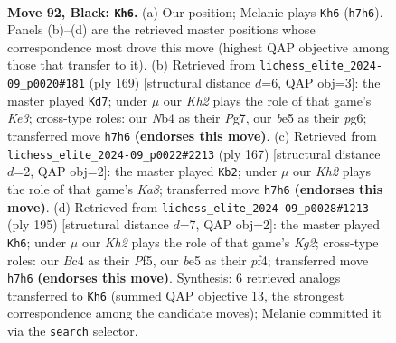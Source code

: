 \documentclass[11pt]{article}
\begin{document}
\clearpage

\begin{figure}[p]\centering
\begin{subfigure}{0.46\textwidth}\centering
\resizebox{\linewidth}{!}{%
\newchessgame
\chessboard[
  setfen={8/7k/8/4B3/1nb5/8/5PK1/8 b - - 30 92},
  showmover=false,
  pgfstyle=straightmove, color=movearrow, markmove={h7-h6}
]}
\caption{}
\end{subfigure}\hfill
\begin{subfigure}{0.46\textwidth}\centering
\resizebox{\linewidth}{!}{%
\newchessgame
\chessboard[
  setfen={8/6p1/1P2k1P1/2K5/8/4n3/8/8 b - - 0 85},
  showmover=false,
  pgfstyle=straightmove, color=movearrow, markmove={e6-d7}
]}
\caption{}
\end{subfigure}
\\[4pt]
\begin{subfigure}{0.46\textwidth}\centering
\resizebox{\linewidth}{!}{%
\newchessgame
\chessboard[
  setfen={8/8/6b1/8/1PK5/6B1/8/k7 b - - 2 84},
  showmover=false,
  pgfstyle=straightmove, color=movearrow, markmove={a1-b2}
]}
\caption{}
\end{subfigure}\hfill
\begin{subfigure}{0.46\textwidth}\centering
\resizebox{\linewidth}{!}{%
\newchessgame
\chessboard[
  setfen={8/6k1/8/5p2/5P1P/7K/8/8 b - - 15 98},
  showmover=false,
  pgfstyle=straightmove, color=movearrow, markmove={g7-h6}
]}
\caption{}
\end{subfigure}
\caption{\textbf{Move 92, Black: \texttt{Kh6}.} (a) Our position; Melanie plays \texttt{Kh6} (\texttt{h7h6}). Panels (b)--(d) are the retrieved master positions whose correspondence most drove this move (highest QAP objective among those that transfer to it). (b) Retrieved from \texttt{lichess\_elite\_2024-09\_p0020\#181} (ply 169) [structural distance $d$=6, QAP obj=3]: the master played \texttt{Kd7}; under $\mu$ our \emph{Kh2} plays the role of that game's \emph{Ke3}; cross-type roles: our \emph{N}b4 as their \emph{P}g7, our \emph{b}e5 as their \emph{p}g6; transferred move \texttt{h7h6} \textbf{(endorses this move)}. (c) Retrieved from \texttt{lichess\_elite\_2024-09\_p0022\#2213} (ply 167) [structural distance $d$=2, QAP obj=2]: the master played \texttt{Kb2}; under $\mu$ our \emph{Kh2} plays the role of that game's \emph{Ka8}; transferred move \texttt{h7h6} \textbf{(endorses this move)}. (d) Retrieved from \texttt{lichess\_elite\_2024-09\_p0028\#1213} (ply 195) [structural distance $d$=7, QAP obj=2]: the master played \texttt{Kh6}; under $\mu$ our \emph{Kh2} plays the role of that game's \emph{Kg2}; cross-type roles: our \emph{B}c4 as their \emph{P}f5, our \emph{b}e5 as their \emph{p}f4; transferred move \texttt{h7h6} \textbf{(endorses this move)}. Synthesis: 6 retrieved analogs transferred to \texttt{Kh6} (summed QAP objective 13, the strongest correspondence among the candidate moves); Melanie committed it via the \texttt{search} selector.}
\label{fig:thought-m183}
\end{figure}
\end{document}

